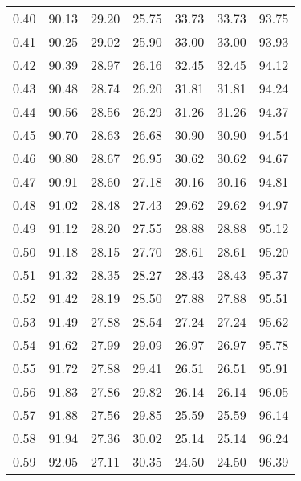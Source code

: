 \begin{tabular}{|c|c|c|c|c|c|c|}
      0.40 &     90.13 &     29.20 &      25.75 &   33.73 &      33.73 &         93.75 \\
      0.41 &     90.25 &     29.02 &      25.90 &   33.00 &      33.00 &         93.93 \\
      0.42 &     90.39 &     28.97 &      26.16 &   32.45 &      32.45 &         94.12 \\
      0.43 &     90.48 &     28.74 &      26.20 &   31.81 &      31.81 &         94.24 \\
      0.44 &     90.56 &     28.56 &      26.29 &   31.26 &      31.26 &         94.37 \\
      0.45 &     90.70 &     28.63 &      26.68 &   30.90 &      30.90 &         94.54 \\
      0.46 &     90.80 &     28.67 &      26.95 &   30.62 &      30.62 &         94.67 \\
      0.47 &     90.91 &     28.60 &      27.18 &   30.16 &      30.16 &         94.81 \\
      0.48 &     91.02 &     28.48 &      27.43 &   29.62 &      29.62 &         94.97 \\
      0.49 &     91.12 &     28.20 &      27.55 &   28.88 &      28.88 &         95.12 \\
      0.50 &     91.18 &     28.15 &      27.70 &   28.61 &      28.61 &         95.20 \\
      0.51 &     91.32 &     28.35 &      28.27 &   28.43 &      28.43 &         95.37 \\
      0.52 &     91.42 &     28.19 &      28.50 &   27.88 &      27.88 &         95.51 \\
      0.53 &     91.49 &     27.88 &      28.54 &   27.24 &      27.24 &         95.62 \\
      0.54 &     91.62 &     27.99 &      29.09 &   26.97 &      26.97 &         95.78 \\
      0.55 &     91.72 &     27.88 &      29.41 &   26.51 &      26.51 &         95.91 \\
      0.56 &     91.83 &     27.86 &      29.82 &   26.14 &      26.14 &         96.05 \\
      0.57 &     91.88 &     27.56 &      29.85 &   25.59 &      25.59 &         96.14 \\
      0.58 &     91.94 &     27.36 &      30.02 &   25.14 &      25.14 &         96.24 \\
      0.59 &     92.05 &     27.11 &      30.35 &   24.50 &      24.50 &         96.39 \\

\end{tabular}
